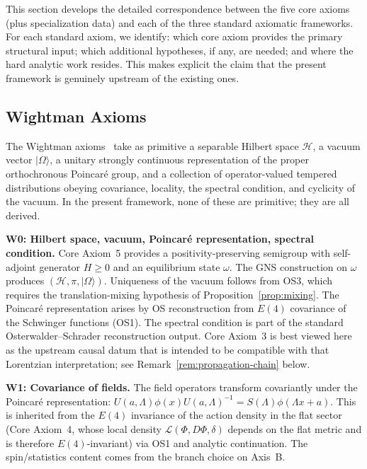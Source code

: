 \documentclass[12pt,a4paper]{article}
\theoremstyle{plain}
\theoremstyle{definition}
\theoremstyle{remark}
\newcommand{\hilb}{\mathcal{H}}
\newcommand{\lag}{\mathcal{L}}
\begin{document}
This section develops the detailed correspondence between the five
core axioms (plus specialization data) and each of the three standard
axiomatic frameworks. For each standard axiom, we identify: which core
axiom provides the primary structural input; which additional
hypotheses, if any, are needed; and where the hard analytic work
resides. This makes explicit the claim that the present framework is
genuinely upstream of the existing ones.


\subsection{Wightman Axioms}

The Wightman axioms~\cite{Wightman1956, StreaterWightman} take as
primitive a separable Hilbert space $\hilb$, a vacuum vector
$|\Omega\rangle$, a unitary strongly continuous representation of the
proper orthochronous Poincar\'e group, and a collection of
operator-valued tempered distributions obeying covariance, locality,
the spectral condition, and cyclicity of the vacuum. In the present
framework, none of these are primitive; they are all derived.

\medskip

\noindent\textbf{W0: Hilbert space, vacuum, Poincar\'e
  representation, spectral condition.} Core Axiom~5 provides a
positivity-preserving semigroup with self-adjoint generator $H \ge 0$
and an equilibrium state $\omega$. The GNS construction on $\omega$
produces $(\hilb, \pi, |\Omega\rangle)$. Uniqueness of the vacuum
follows from OS3, which requires the translation-mixing hypothesis of
Proposition~\ref{prop:mixing}. The
Poincar\'e representation arises by OS reconstruction from $E(4)$
covariance of the Schwinger functions (OS1). The spectral condition
is part of the standard Osterwalder--Schrader reconstruction output.
Core Axiom~3 is best viewed here as the upstream causal datum that is
intended to be compatible with that Lorentzian interpretation; see
Remark~\ref{rem:propagation-chain} below.

\medskip

\noindent\textbf{W1: Covariance of fields.} The field operators
transform covariantly under the Poincar\'e representation:
$U(a,\Lambda)\phi(x)U(a,\Lambda)^{-1} = S(\Lambda)\phi(\Lambda x +
a)$. This is inherited from the $E(4)$ invariance of the action
density in the flat sector (Core Axiom~4, whose local density
$\lag(\Phi, D\Phi, \delta)$ depends on the flat metric and is
therefore $E(4)$-invariant) via OS1 and analytic continuation. The
spin/statistics content comes from the branch choice on Axis~B.
\end{document}
